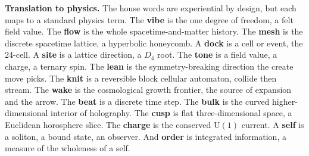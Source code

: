 \textbf{Translation to physics.} The house words are experiential by design, but each maps to a standard physics term. The \textbf{vibe} is the one degree of freedom, a felt field value. The \textbf{flow} is the whole spacetime-and-matter history. The \textbf{mesh} is the discrete spacetime lattice, a hyperbolic honeycomb. A \textbf{dock} is a cell or event, the 24-cell. A \textbf{site} is a lattice direction, a $D_4$ root. The \textbf{tone} is a field value, a charge, a ternary spin. The \textbf{lean} is the symmetry-breaking direction the create move picks. The \textbf{knit} is a reversible block cellular automaton, collide then stream. The \textbf{wake} is the cosmological growth frontier, the source of expansion and the arrow. The \textbf{beat} is a discrete time step. The \textbf{bulk} is the curved higher-dimensional interior of holography. The \textbf{cusp} is flat three-dimensional space, a Euclidean horosphere slice. The \textbf{charge} is the conserved $\mathrm{U}(1)$ current. A \textbf{self} is a soliton, a bound state, an observer. And \textbf{order} is integrated information, a measure of the wholeness of a self.
